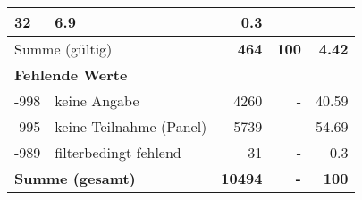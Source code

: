 \begin{longtable}{lXrrr}
       \num{32} &
       \num[round-mode=places,round-precision=2]{6.9} &
         \num[round-mode=places,round-precision=2]{0.3} \\
     \midrule
     \multicolumn{2}{l}{Summe (gültig)} &
       \textbf{\num{464}} &
     \textbf{\num{100}} &
       \textbf{\num[round-mode=places,round-precision=2]{4.42}} \\
     \multicolumn{5}{l}{\textbf{Fehlende Werte}}\\
       -998 &
       keine Angabe &
         \num{4260} &
        - &
         \num[round-mode=places,round-precision=2]{40.59} \\
       -995 &
       keine Teilnahme (Panel) &
         \num{5739} &
        - &
         \num[round-mode=places,round-precision=2]{54.69} \\
       -989 &
       filterbedingt fehlend &
         \num{31} &
        - &
         \num[round-mode=places,round-precision=2]{0.3} \\
     \midrule
     \multicolumn{2}{l}{\textbf{Summe (gesamt)}} &
          \textbf{\num{10494}} &
        \textbf{-} &
        \textbf{\num{100}} \\
     \bottomrule
     \end{longtable}
     
